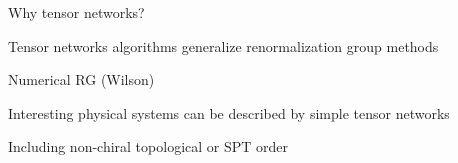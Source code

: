 \begin{frame}{Why tensor networks?}
    \bi
    \item <1-> Tensor networks algorithms generalize renormalization group methods
    \bi
    \item <2-> Numerical RG (Wilson)
    \begin{figure}[htbp]
               \scalebox{0.6}{ }
            \end{figure}
    \ei
    \item <3-> Interesting physical systems can be described by simple tensor networks
    \bi
    \item <4-> Including non-chiral topological or SPT order
    \ei
    \ei
\end{frame}
